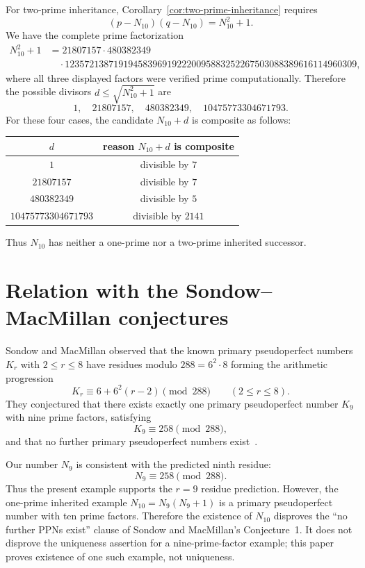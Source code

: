 \documentclass[11pt]{amsart}
\theoremstyle{plain}
\theoremstyle{definition}
\theoremstyle{remark}
\begin{document}
For two-prime inheritance, Corollary~\ref{cor:two-prime-inheritance} requires
\[
        (p-N_{10})(q-N_{10})=N_{10}^2+1.
\]
We have the complete prime factorization
\[
\begin{aligned}
        N_{10}^2+1
        &=21807157\cdot480382349\\
        &\quad\cdot123572138719194583969192220095883252267503088389616114960309,
\end{aligned}
\]
where all three displayed factors were verified prime computationally.  Therefore the possible divisors $d\le\sqrt{N_{10}^2+1}$ are
\[
        1,
        \quad
        21807157,
        \quad
        480382349,
        \quad
        10475773304671793.
\]
For these four cases, the candidate $N_{10}+d$ is composite as follows:
\begin{center}
\begin{tabular}{cc}
\toprule
$d$ & reason $N_{10}+d$ is composite \\
\midrule
$1$ & divisible by $7$ \\
$21807157$ & divisible by $7$ \\
$480382349$ & divisible by $5$ \\
$10475773304671793$ & divisible by $2141$ \\
\bottomrule
\end{tabular}
\end{center}
Thus $N_{10}$ has neither a one-prime nor a two-prime inherited successor.

\section{Relation with the Sondow--MacMillan conjectures}\label{sec:sondow-macmillan}

Sondow and MacMillan observed that the known primary pseudoperfect numbers $K_r$ with $2\le r\le8$ have residues modulo $288=6^2\cdot8$ forming the arithmetic progression
\[
        K_r\equiv 6+6^2(r-2)\pmod{288}
        \qquad (2\le r\le8).
\]
They conjectured that there exists exactly one primary pseudoperfect number $K_9$ with nine prime factors, satisfying
\[
        K_9\equiv258\pmod{288},
\]
and that no further primary pseudoperfect numbers exist~\cite{SondowMacMillan}.

Our number $N_9$ is consistent with the predicted ninth residue:
\[
        N_9\equiv258\pmod{288}.
\]
Thus the present example supports the $r=9$ residue prediction.  However, the one-prime inherited example $N_{10}=N_9(N_9+1)$ is a primary pseudoperfect number with ten prime factors.  Therefore the existence of $N_{10}$ disproves the ``no further PPNs exist'' clause of Sondow and MacMillan's Conjecture~1.  It does not disprove the uniqueness assertion for a nine-prime-factor example; this paper proves existence of one such example, not uniqueness.
\end{document}
